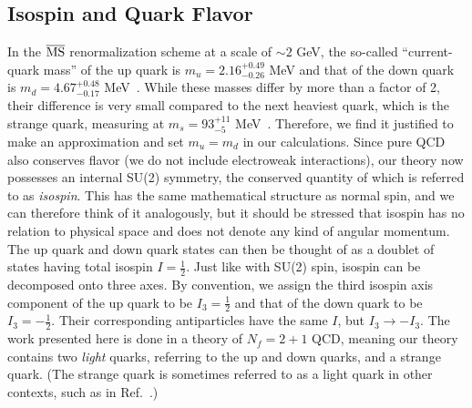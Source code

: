     \subsection{Isospin and Quark Flavor}
    In the $\overline{\rm{MS}}$ renormalization scheme at a scale of $\sim 2$ GeV, the so-called ``current-quark mass'' of the up quark is $m_u = 2.16^{+0.49}_{-0.26}$ MeV and that of the down quark is $m_d = 4.67^{+0.48}_{-0.17}$ MeV~\cite{PhysRevD.98.030001}. While these masses differ by more than a factor of 2, their difference is very small compared to the next heaviest quark, which is the strange quark, measuring at $m_s = 93^{+11}_{-5}$ MeV~\cite{PhysRevD.98.030001}. Therefore, we find it justified to make an approximation and set $m_u = m_d$ in our calculations. Since pure QCD also conserves flavor (we do not include electroweak interactions), our theory now possesses an internal SU(2) symmetry, the conserved quantity of which is referred to as \emph{isospin}. This has the same mathematical structure as normal spin, and we can therefore think of it analogously, but it should be stressed that isospin has no relation to physical space and does not denote any kind of angular momentum. The up quark and down quark states can then be thought of as a doublet of states having total isospin $I=\frac{1}{2}$. Just like with SU(2) spin, isospin can be decomposed onto three axes. By convention, we assign the third isospin axis component of the up quark to be $I_3 = \frac{1}{2}$ and that of the down quark to be $I_3 = -\frac{1}{2}$. Their corresponding antiparticles have the same $I$, but $I_3\rightarrow -I_3$. The work presented here is done in a theory of $N_f = 2 + 1$ QCD, meaning our theory contains two \emph{light} quarks, referring to the up and down quarks, and a strange quark. (The strange quark is sometimes referred to as a light quark in other contexts, such as in Ref.~\cite{PhysRevD.98.030001}.)
    
